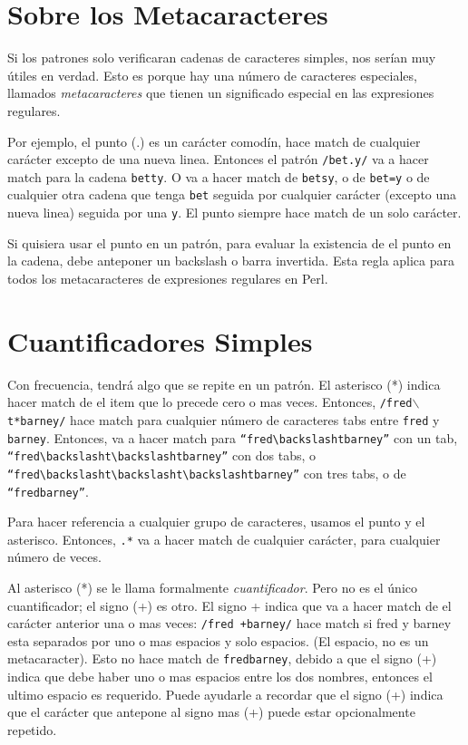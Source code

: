 \section{Sobre los Metacaracteres}

\label{Sobre-los-Metacaracteres}

Si los patrones solo verif\mbox{}icaran cadenas de caracteres simples, nos serían muy útiles en verdad. Esto es porque hay una número de caracteres especiales, llamados \emph{metacaracteres} que tienen un signif\mbox{}icado especial en las expresiones regulares.

Por ejemplo, el punto (.) es un carácter comodín, hace match de cualquier carácter excepto de una nueva linea. Entonces el patrón \texttt{/bet.y/} va a hacer match para la cadena \texttt{betty}. O va a hacer match de \texttt{betsy}, o de \texttt{bet=y} o de cualquier otra cadena que tenga \texttt{bet} seguida por cualquier carácter (excepto una nueva linea) seguida por una \texttt{y}. El punto siempre hace match de un solo carácter.

Si quisiera usar el punto en un patrón, para evaluar la existencia de el punto en la cadena, debe anteponer un backslash o barra invertida. Esta regla aplica para todos los metacaracteres de expresiones regulares en Perl.

\section{Cuantif\mbox{}icadores Simples}

\label{Cuantificadores-Simples}

Con frecuencia, tendrá algo que se repite en un patrón. El asterisco (*) indica hacer match de el item que lo precede cero o mas veces. Entonces, \texttt{/fred$\backslash$t*barney/} hace match para cualquier número de caracteres tabs entre \texttt{fred} y \texttt{barney}. Entonces, va a hacer match para \texttt{``fred$\backslash$tbarney''} con un tab, \texttt{``fred$\backslash$t$\backslash$tbarney''} con dos tabs, o \texttt{``fred$\backslash$t$\backslash$t$\backslash$tbarney''} con tres tabs, o de \texttt{``fredbarney''}.

Para hacer referencia a cualquier grupo de caracteres, usamos el punto y el asterisco. Entonces, \texttt{.*} va a hacer match de cualquier carácter, para cualquier número de veces.

Al asterisco (*) se le llama formalmente \emph{cuantif\mbox{}icador}. Pero no es el único cuantif\mbox{}icador; el signo (+) es otro. El signo + indica que va a hacer match de el carácter anterior una o mas veces: \texttt{/fred +barney/} hace match si fred y barney esta separados por uno o mas espacios y solo espacios. (El espacio, no es un metacaracter). Esto no hace match de \texttt{fredbarney}, debido a que el signo (+) indica que debe haber uno o mas espacios entre los dos nombres, entonces el ultimo espacio es requerido. Puede ayudarle a recordar que el signo (+) indica que el carácter que antepone al signo mas (+) puede estar opcionalmente repetido.


